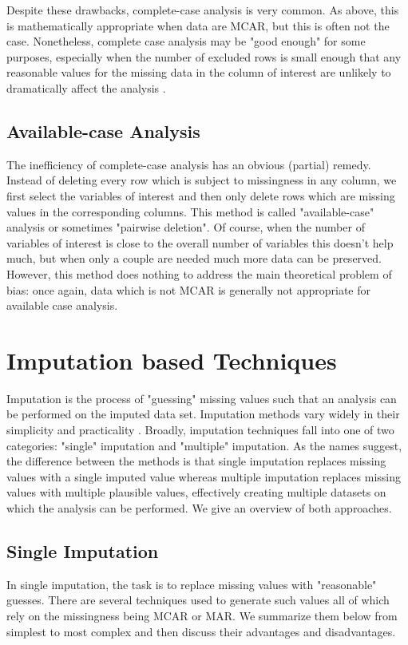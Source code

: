 \documentclass[12pt,twoside]{reedthesis}
\theoremstyle{definition}
\begin{document}
Despite these drawbacks, complete-case analysis is very common. As above, this is mathematically appropriate when data are MCAR, but this is often not the case. Nonetheless, complete case analysis may be "good enough" for some purposes, especially when the number of excluded rows is small enough that any reasonable values for the missing data in the column of interest are unlikely to dramatically affect the analysis \citep{Schafer_2002}.

\subsection{Available-case Analysis}

The inefficiency of complete-case analysis has an obvious (partial) remedy. Instead of deleting every row which is subject to missingness in any column, we first select the variables of interest and then only delete rows which are missing values in the corresponding columns. This method is called "available-case" analysis or sometimes "pairwise deletion". Of course, when the number of variables of interest is close to the overall number of variables this doesn't help much, but when only a couple are needed much more data can be preserved. However, this method does nothing to address the main theoretical problem of bias: once again, data which is not MCAR is generally not appropriate for available case analysis.



\section{Imputation based Techniques} 

Imputation is the process of "guessing" missing values such that an analysis can be performed on the imputed data set. Imputation methods vary widely in their simplicity and practicality \citep{Schafer_2002}. Broadly, imputation techniques fall into one of two categories: "single" imputation and "multiple" imputation. As the names suggest, the difference between the methods is that single imputation replaces missing values with a single imputed value whereas multiple imputation replaces missing values with multiple plausible values, effectively creating multiple datasets on which the analysis can be performed. We give an overview of both approaches.

\subsection{Single Imputation}
In single imputation, the task is to replace missing values with "reasonable" guesses. There are several techniques used to generate such values all of which rely on the missingness being MCAR or MAR. We summarize them below from simplest to most complex and then discuss their advantages and disadvantages. 
\end{document}
